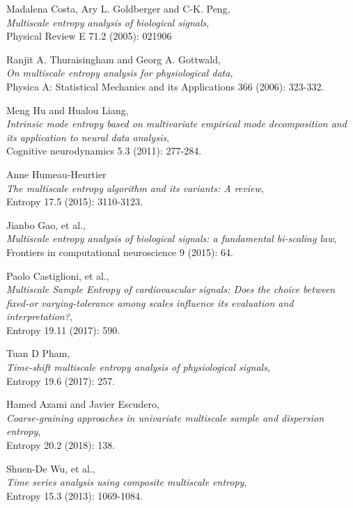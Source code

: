 \documentclass[12pt, a4paper, titlepage, openany]{book}
\begin{document}
\begin{thebibliography}{9}
Madalena Costa, Ary L. Goldberger and C-K. Peng,\\
\emph{Multiscale entropy analysis of biological signals},\\
Physical Review E 71.2 (2005): 021906

Ranjit A. Thuraisingham and Georg A. Gottwald,\\
\emph{On multiscale entropy analysis for physiological data},\\
Physica A: Statistical Mechanics and its Applications 366 (2006): 323-332.

Meng Hu and Hualou Liang,\\
\emph{Intrinsic mode entropy based on multivariate empirical mode decomposition and its application to neural data analysis},\\
Cognitive neurodynamics 5.3 (2011): 277-284.

Anne Humeau-Heurtier \\
\emph{The multiscale entropy algorithm and its variants: A review},\\
Entropy 17.5 (2015): 3110-3123.

Jianbo Gao, et al.,\\
\emph{Multiscale entropy analysis of biological signals: a fundamental bi-scaling law},\\
Frontiers in computational neuroscience 9 (2015): 64.

Paolo Castiglioni, et al.,\\
\emph{Multiscale Sample Entropy of cardiovascular signals: Does the choice between fixed-or varying-tolerance among scales influence its evaluation and interpretation?},\\
Entropy 19.11 (2017): 590.

Tuan D Pham,\\
\emph{Time-shift multiscale entropy analysis of physiological signals},\\
Entropy 19.6 (2017): 257.

Hamed Azami and Javier Escudero,\\
\emph{Coarse-graining approaches in univariate multiscale sample and dispersion entropy},\\
Entropy 20.2 (2018): 138.

Shuen-De Wu, et al.,\\
\emph{Time series analysis using composite multiscale entropy},\\
Entropy 15.3 (2013): 1069-1084.


\end{thebibliography}
\end{document}
